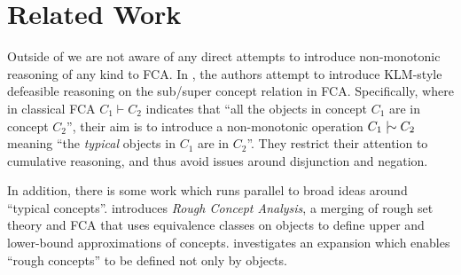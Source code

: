 \section{Related Work}
\label{section: related work}

Outside of \cite{ding2024defeasiblereasoningconcepts} we are not aware of any direct attempts to introduce non-monotonic reasoning of any kind to FCA. In \cite{ding2024defeasiblereasoningconcepts}, the authors attempt to introduce KLM-style defeasible reasoning on the sub/super concept relation in FCA. Specifically, where in classical FCA $C_1 \vdash C_2$ indicates that ``all the objects in concept $C_1$ are in concept $C_2$'', their aim is to introduce a non-monotonic operation $C_1 \twiddle C_2$ meaning ``the \textit{typical} objects in $C_1$ are in $C_2$''. They restrict their attention to cumulative reasoning, and thus avoid issues around disjunction and negation.

In addition, there is some work which runs parallel to broad ideas around ``typical concepts''. \cite{kent1996rough} introduces \textit{Rough Concept Analysis}, a merging of rough set theory and FCA that uses equivalence classes on objects to define upper and lower-bound approximations of concepts. \cite{yao2016rough} investigates an expansion which enables ``rough concepts'' to be defined not only by objects.
